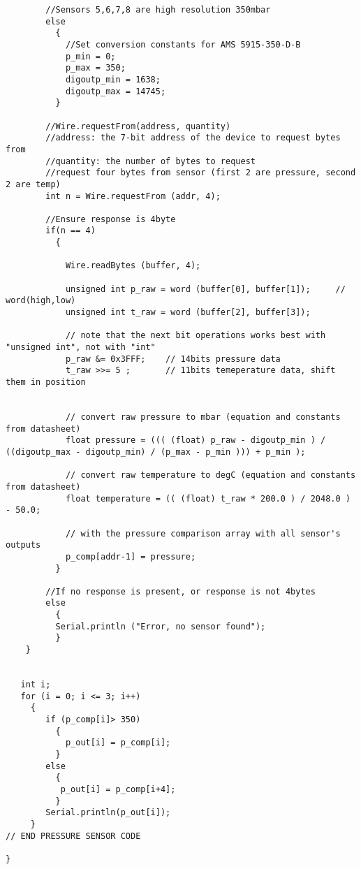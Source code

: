 \begin{lstlisting}
        //Sensors 5,6,7,8 are high resolution 350mbar
        else
          {
            //Set conversion constants for AMS 5915-350-D-B
            p_min = 0;
            p_max = 350;
            digoutp_min = 1638;
            digoutp_max = 14745;
          }

        //Wire.requestFrom(address, quantity)
        //address: the 7-bit address of the device to request bytes from
        //quantity: the number of bytes to request
        //request four bytes from sensor (first 2 are pressure, second 2 are temp)
        int n = Wire.requestFrom (addr, 4);
    
        //Ensure response is 4byte
        if(n == 4)
          {
          
            Wire.readBytes (buffer, 4);
        
            unsigned int p_raw = word (buffer[0], buffer[1]);     // word(high,low)
            unsigned int t_raw = word (buffer[2], buffer[3]);
        
            // note that the next bit operations works best with "unsigned int", not with "int"
            p_raw &= 0x3FFF;    // 14bits pressure data
            t_raw >>= 5 ;       // 11bits temeperature data, shift them in position
        
            
            // convert raw pressure to mbar (equation and constants from datasheet)
            float pressure = ((( (float) p_raw - digoutp_min ) / ((digoutp_max - digoutp_min) / (p_max - p_min ))) + p_min );
        
            // convert raw temperature to degC (equation and constants from datasheet)
            float temperature = (( (float) t_raw * 200.0 ) / 2048.0 ) - 50.0;
        
            // with the pressure comparison array with all sensor's outputs
            p_comp[addr-1] = pressure;
          }

        //If no response is present, or response is not 4bytes
        else
          {
          Serial.println ("Error, no sensor found");
          }
    }

      
   int i;
   for (i = 0; i <= 3; i++)
     {
        if (p_comp[i]> 350) 
          {
            p_out[i] = p_comp[i];
          }
        else 
          {
           p_out[i] = p_comp[i+4];
          }
        Serial.println(p_out[i]);
     }
// END PRESSURE SENSOR CODE

}
    \end{lstlisting}


